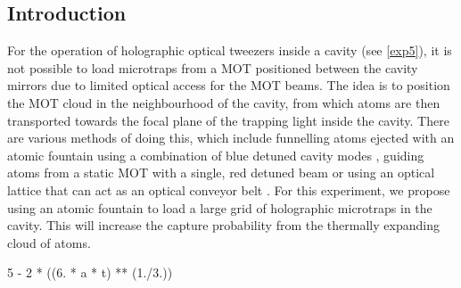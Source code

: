 \documentclass[../Thesis-IJspeert.tex]{subfiles}
\begin{document}
\subsection{Introduction}
For the operation of holographic optical tweezers inside a cavity (see \autoref{exp5}), it is not possible to load microtraps from a MOT positioned between the cavity mirrors due to limited optical access for the MOT beams. The idea is to position the MOT cloud in the neighbourhood of the cavity, from which atoms are then transported towards the focal plane of the trapping light inside the cavity. There are various methods of doing this, which include funnelling atoms ejected with an atomic fountain using a combination of blue detuned cavity modes \cite{Puppe2007}, guiding atoms from a static MOT with a single, red detuned beam \cite{Numann2005} or using an optical lattice that can act as an optical conveyor belt \cite{Gallego2018,Schrader2001}. For this experiment, we propose using an atomic fountain to load a large grid of holographic microtraps in the cavity. This will increase the capture probability from the thermally expanding cloud of atoms.



5 - 2 * ((6. * a * t) ** (1./3.))
\end{document}

